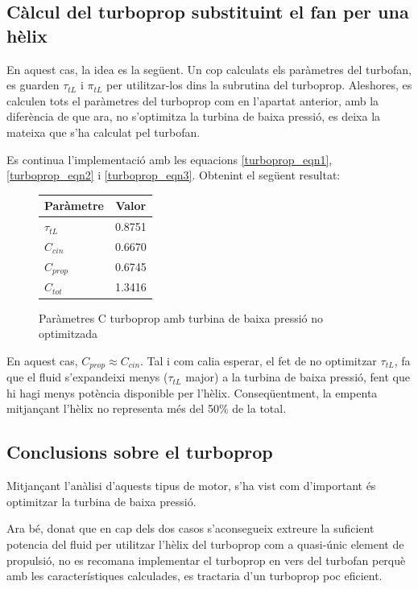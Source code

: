 \subsection{Càlcul del turboprop substituint el fan per una hèlix}
En aquest cas, la idea es la següent. Un cop calculats els paràmetres del turbofan, es guarden $\tau_{tL}$ i $\pi_{tL}$  per utilitzar-los dins la subrutina del turboprop. Aleshores, es calculen tots el paràmetres del turboprop com en l'apartat anterior, amb la diferència de que ara, no s'optimitza la turbina de baixa pressió, es deixa la mateixa que s'ha calculat pel turbofan.

\noindent Es continua l'implementació amb les equacions \ref{turboprop_eqn1}, \ref{turboprop_eqn2} i \ref{turboprop_eqn3}. Obtenint el següent resultat:
\begin{figure}[H]
	\centering
	\begin{tabular}{lc}
		\toprule[3pt]
		\textbf{Paràmetre}&\textbf{Valor}\\
		\midrule[1pt]
		$\tau_{tL}$ & 0.8751\\
		$C_{cin}$ & 0.6670\\
		$C_{prop}$ & 0.6745\\
		$C_{tot}$ & 1.3416\\
		
		\bottomrule[2pt]
	\end{tabular}
	\label{C_opti2}
	\caption{Paràmetres C turboprop amb turbina de baixa pressió no optimitzada}
\end{figure}
\noindent En aquest cas, $C_{prop}\approx C_{cin}$. Tal i com calia esperar, el fet de no optimitzar $\tau_{tL}$, fa que el fluid s'expandeixi menys ($\tau_{tL}$ major) a la turbina de baixa pressió, fent que hi hagi menys potència disponible per l'hèlix. Conseqüentment, la empenta mitjançant l'hèlix no representa més del 50\% de la total.

\subsection{Conclusions sobre el turboprop}
Mitjançant l'anàlisi d'aquests tipus de motor, s'ha vist com d'important és optimitzar la turbina de baixa pressió.

\noindent Ara bé, donat que en cap dels dos casos s'aconsegueix extreure la suficient potencia del fluid per utilitzar l'hèlix del turboprop com a quasi-únic element de propulsió, no es recomana implementar el turboprop en vers del turbofan perquè amb les característiques calculades, es tractaria d'un turboprop poc eficient.

